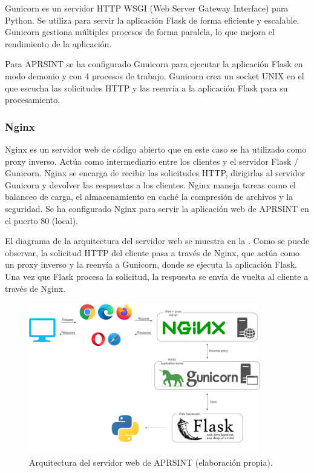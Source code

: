 Gunicorn es un servidor HTTP WSGI (Web Server Gateway Interface) para Python. Se utiliza para servir la aplicación Flask de forma eficiente y escalable. Gunicorn gestiona múltiples procesos de forma paralela, lo que mejora el rendimiento de la aplicación.

Para APRSINT se ha configurado Gunicorn para ejecutar la aplicación Flask en modo demonio y con 4 procesos de trabajo. Gunicorn crea un socket UNIX en el que escucha las solicitudes HTTP y las reenvía a la aplicación Flask para su procesamiento.

\subsubsection*{Nginx}

Nginx es un servidor web de código abierto que en este caso se ha utilizado como proxy inverso. Actúa como intermediario entre los clientes y el servidor Flask / Gunicorn. Nginx se encarga de recibir las solicitudes HTTP, dirigirlas al servidor Gunicorn y devolver las respuestas a los clientes. Nginx maneja tareas como el balanceo de carga, el almacenamiento en caché la compresión de archivos y la seguridad. Se ha configurado Nginx para servir la aplicación web de APRSINT en el puerto 80 (local).

El diagrama de la arquitectura del servidor web se muestra en la . Como se puede observar, la solicitud HTTP del cliente pasa a través de Nginx, que actúa como un proxy inverso y la reenvía a Gunicorn, donde se ejecuta la aplicación Flask. Una vez que Flask procesa la solicitud, la respuesta se envía de vuelta al cliente a través de Nginx.

\begin{figure}[h]
	\centering
	\includegraphics[width=0.9\textwidth]{Imagenes/Chapter_4/web_server.png}
	\caption[Arquitectura del servidor web de APRSINT.]{Arquitectura del servidor web de APRSINT (elaboración propia).}
	\label{fig:web-server}
\end{figure}

